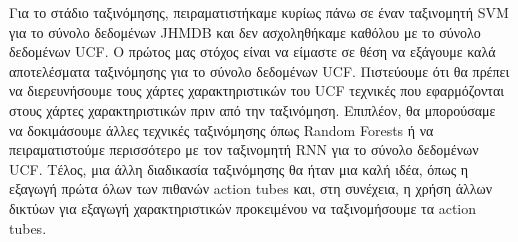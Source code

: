Για το στάδιο ταξινόμησης, πειραματιστήκαμε κυρίως πάνω σε έναν ταξινομητή \en SVM  \gr για το σύνολο δεδομένων \en JHMDB \gr και δεν ασχοληθήκαμε καθόλου  με το σύνολο δεδομένων \en UCF\gr. Ο πρώτος μας
στόχος είναι να είμαστε σε θέση να εξάγουμε καλά αποτελέσματα ταξινόμησης για το σύνολο δεδομένων \en UCF\gr.  Πιστεύουμε ότι θα πρέπει να διερευνήσουμε τους χάρτες χαρακτηριστικών του \en UCF   τεχνικές  που εφαρμόζονται στους χάρτες χαρακτηριστικών πριν από την ταξινόμηση. Επιπλέον, θα μπορούσαμε να δοκιμάσουμε άλλες τεχνικές ταξινόμησης όπως \en Random Forests \gr ή να πειραματιστούμε περισσότερο με τον ταξινομητή \en RNN \gr για το σύνολο δεδομένων \en UCF\gr.
Τέλος, μια άλλη διαδικασία ταξινόμησης θα ήταν μια καλή ιδέα, όπως η εξαγωγή πρώτα όλων των πιθανών \en action tubes \gr και, στη συνέχεια, η χρήση άλλων δικτύων για εξαγωγή χαρακτηριστικών προκειμένου
να ταξινομήσουμε τα \en action tubes\gr.

\en
% 